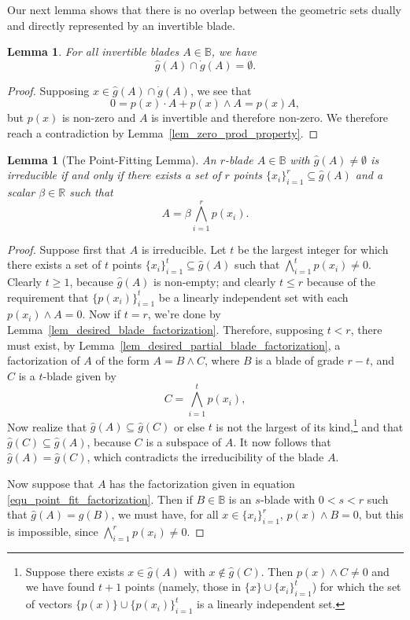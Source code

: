 \documentclass{birkjour}
\newtheorem{lem}[thm]{Lemma}
\theoremstyle{definition}
\theoremstyle{remark}
\numberwithin{equation}{section}
\newcommand{\R}{\mathbb{R}}
\newcommand{\B}{\mathbb{B}}
\newcommand{\gd}{\dot{g}}
\newcommand{\gh}{\hat{g}}
\begin{document}
Our next lemma shows that there is no overlap between the geometric sets dually and directly
represented by an invertible blade.

\begin{lem}
For all invertible blades $A\in\B$, we have
\begin{equation}
\gh(A)\cap\gd(A)=\emptyset.
\end{equation}
\end{lem}
\begin{proof}
Supposing $x\in\gh(A)\cap\gd(A)$, we see that
\begin{equation}
0 = p(x)\cdot A + p(x)\wedge A = p(x)A,
\end{equation}
but $p(x)$ is non-zero and $A$ is invertible and therefore non-zero.  We therefore reach a
contradiction by Lemma~\ref{lem_zero_prod_property}.
\end{proof}

\begin{lem}[The Point-Fitting Lemma]\label{lem_factorization_of_irreducible_blades}
An $r$-blade $A\in\B$ with $\gh(A)\neq\emptyset$ is irreducible if and only if there exists a set of $r$ points
$\{x_i\}_{i=1}^r\subseteq\gh(A)$ and a scalar $\beta\in\R$ such that
\begin{equation}\label{equ_point_fit_factorization}
A=\beta\bigwedge_{i=1}^r p(x_i).
\end{equation}
\end{lem}
\begin{proof}
Suppose first that $A$ is irreducible.
Let $t$ be the largest integer for which there exists a set of $t$ points $\{x_i\}_{i=1}^t\subseteq\gh(A)$ such that
$\bigwedge_{i=1}^t p(x_i)\neq 0$.
Clearly $t\geq 1$, because $\gh(A)$ is non-empty; and clearly $t\leq r$ because of
the requirement that $\{p(x_i)\}_{i=1}^t$ be a linearly independent set with each $p(x_i)\wedge A=0$.  Now if $t=r$, we're
done by Lemma~\ref{lem_desired_blade_factorization}.  Therefore,
supposing $t<r$, there must exist, by Lemma~\ref{lem_desired_partial_blade_factorization}, a factorization of $A$ of the form
$A=B\wedge C$, where $B$ is a blade of grade $r-t$, and $C$ is a $t$-blade given by
\begin{equation}
C=\bigwedge_{i=1}^t p(x_i),
\end{equation}
Now realize that $\gh(A)\subseteq\gh(C)$ or else $t$ is not the largest of its kind,\footnote{Suppose
there exists $x\in\gh(A)$ with $x\not\in\gh(C)$.  Then $p(x)\wedge C\neq 0$ and we have found $t+1$
points (namely, those in $\{x\}\cup\{x_i\}_{i=1}^t$) for which the set of vectors $\{p(x)\}\cup\{p(x_i)\}_{i=1}^t$ is a linearly independent set.} and
that $\gh(C)\subseteq\gh(A)$, because $C$ is a subspace of $A$.
It now follows that $\gh(A)=\gh(C)$, which contradicts the irreducibility of the blade $A$.

Now suppose that $A$ has the factorization given in equation \eqref{equ_point_fit_factorization}.
Then if $B\in\B$ is an $s$-blade with $0<s<r$ such that $\gh(A)=\gh(B)$, we must have, for all $x\in\{x_i\}_{i=1}^r$,
$p(x)\wedge B=0$, but this is impossible, since $\bigwedge_{i=1}^r p(x_i)\neq 0$.
\end{proof}
\end{document}
